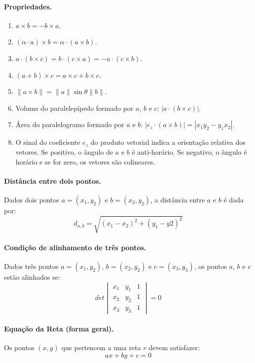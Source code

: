 \paragraph{Propriedades.} \empty

	\begin{enumerate}
		\item $a \times b = -b \times a$.
		\item $(\alpha \cdot a) \times b = \alpha \cdot (a \times b)$.
		\item $a \cdot (b \times c) = b\cdot (c \times a) = -a\cdot(c\times b)$.
		\item $(a+b)\times c = a\times c + b\times c$.
		\item $\|a \times b \| = \|a\|\sin\theta \|b\|$.
		\item Volume do paralelepípedo formado por $a$, $b$ e $c$: $|a \cdot (b \times c)|$.
		\item Área do paralelogramo formado por $a$ e $b$: $|e_z \cdot (a \times b)| = |x_1y_2-y_1x_2|$.
		\item O sinal do coeficiente $e_z$ do produto vetorial indica a orientação relativa dos vetores. Se positivo, o ângulo de $a$ e $b$ é anti-horário. Se negativo, o ângulo é horário e se for zero, os vetores são colineares.
	\end{enumerate}

	\paragraph{Distância entre dois pontos.} Dados dois pontos $a = (x_1,y_2)$ e $b = (x_2,y_2)$, a distância entre $a$ e $b$ é dada por:
		$$d_{a,b} = \sqrt{(x_1 - x_2)^2 + (y_1 - y2)^2}$$

\paragraph{Condição de alinhamento de três pontos.} Dados três pontos $a = (x_1,y_2)$, $b = (x_2,y_2)$ e $c = (x_3,y_3)$, os pontos $a$, $b$ e $c$ estão alinhados se:
		$$det
			\begin{vmatrix}
				x_1 & y_1 & 1 \\
				x_2 & y_2 & 1 \\
				x_3 & y_3 & 1
			\end{vmatrix} = 0 $$

\paragraph{Equação da Reta (forma geral).} Os pontos $(x,y)$ que pertencem a uma reta $r$ devem satisfazer:
		$$ax + by + c = 0$$

